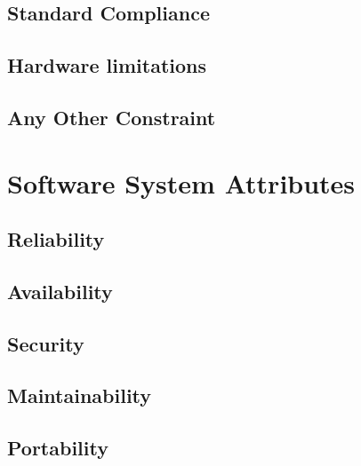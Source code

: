 \subsection{Standard Compliance}
\subsection{Hardware limitations}
\subsection{Any Other Constraint}

\section{Software System Attributes}

\subsection{Reliability}
\subsection{Availability}
\subsection{Security}
\subsection{Maintainability}
\subsection{Portability}